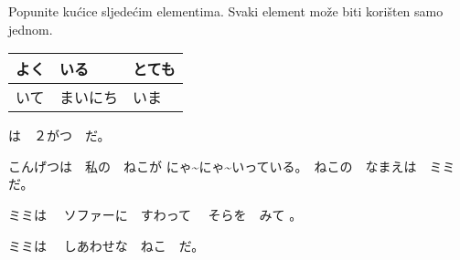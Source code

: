 	\begin{mondai}{Popunite kućice sljedećim elementima. Svaki element može biti korišten samo jednom.
		
		\item\hspace{30pt}
		\begin{tabular}{|l|l|l|}
			\hline
			よく&いる&とても\\\hline
			いて&まいにち&いま\\\hline
		\end{tabular}
	}
	\item\framebox{ \begin{minipage}{0.4in}\hfill\vspace{0.3in}\end{minipage} }\vspace{10pt} は　２がつ　だ。
	\item こんげつは　私の　ねこが \framebox{ \begin{minipage}{0.4in}\hfill\vspace{0.3in}\end{minipage} }\vspace{10pt} にゃ\textasciitilde にゃ\textasciitilde いっている。　ねこの　なまえは　ミミ　だ。
	\item ミミは \framebox{\begin{minipage}{0.4in}\hfill\vspace{0.3in}\end{minipage}}\vspace{10pt}　ソファーに　すわって
	\framebox{\begin{minipage}{0.4in}\hfill\vspace{0.3in}\end{minipage}}\vspace{10pt}　そらを　みて
	\framebox{\begin{minipage}{0.4in}\hfill\vspace{0.3in}\end{minipage}}\vspace{10pt} 。
	\item ミミは \framebox{\begin{minipage}{0.4in}\hfill\vspace{0.3in}\end{minipage}}\vspace{10pt}　しあわせな　ねこ　だ。
		
	\end{mondai}

